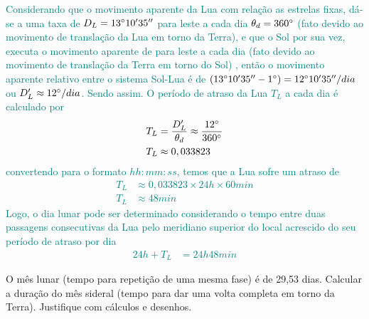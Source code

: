 \begin{sol}
	\textcolor{teal} {
		Considerando que o movimento aparente da Lua com relação as estrelas fixas, dá-se a uma taxa de $D_{L}=13^{\circ}10^{\prime}35^{\prime \prime}$ para leste a cada dia $\theta_{d}=360^{\circ}$ (fato devido ao movimento de translação da Lua em torno da Terra), e que o Sol por sua vez, executa o movimento aparente de  para leste a cada dia (fato devido ao movimento de translação da Terra em torno do Sol) \cite{ASTRN&ASTRFIS:2004}, então o movimento aparente relativo entre o sistema Sol-Lua é de $(13^{\circ}10^{\prime}35^{\prime \prime}-1^{\circ})=12^{\circ}10^{\prime}35^{\prime \prime}/dia$ ou $D^{\prime}_{L}\approx 12^{\circ}/dia$. Sendo assim. O período de atraso da Lua $T_L$ a cada dia é calculado por
		\begin{align}
			T_{L}&=\frac{D^{\prime}_{L}}{\theta_{d}}\approx \frac{12^{\circ}}{360^{\circ}}\nonumber \\
			T_{L}&\approx 0,033823
		\end{align}
		convertendo para o formato $hh:mm:ss$, temos que a Lua sofre um atraso de
		\begin{align}
			T_{L}&\approx 0,033823\times 24h\times 60min \nonumber \\
			T_{L}&\approx 48min
		\end{align}
		Logo, o dia lunar pode ser determinado considerando o tempo entre duas passagens consecutivas da Lua pelo meridiano superior do local acrescido do seu período de atraso por dia
		\begin{align}
			24h+T_{L}&=24h48min
		\end{align}
	}
\end{sol}
\begin{prob}[ref: P20]
	O mês lunar (tempo para repetição de uma mesma fase) é de 29,53 dias. Calcular a duração do
	mês sideral (tempo para dar uma volta completa em torno da Terra). Justifique com cálculos e desenhos.
\end{prob}

